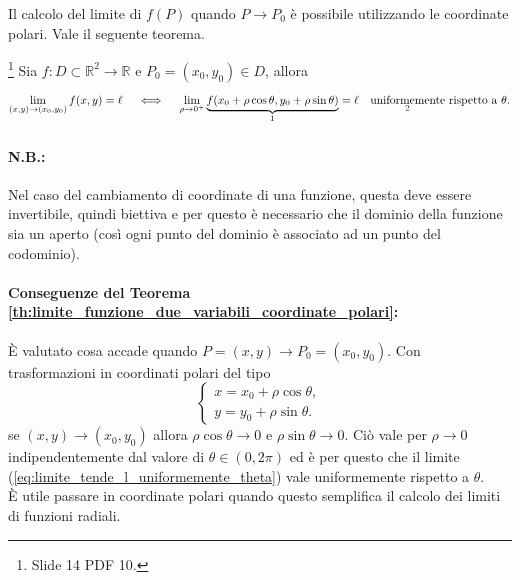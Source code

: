Il calcolo del limite di $f(P)$ quando $P\rightarrow P_0$ è possibile utilizzando le coordinate polari. Vale il seguente teorema.
\begin{theorem}\label{th:limite_funzione_due_variabili_coordinate_polari}\footnote{Slide 14 PDF 10.}
    Sia $f\colon D\subset\mathbb R^2\rightarrow\mathbb R$ e $P_0=(x_0,y_0)\in D$, allora
    \begin{equation}\label{eq:limite_tende_l_uniformemente_theta}
        \lim_{(x,y)\rightarrow(x_0,y_0)}f(x,y)=\ell\quad\iff\quad\lim_{\rho\rightarrow 0^+}\underbrace{f(x_0+\rho\cos\theta,y_0+\rho\sin\theta)}_{\footnotemark}=\ell\quad\text{$\underset{\footnotemark}{\text{uniformemente}}$ rispetto a $\theta$}.
    \end{equation}
\end{theorem}
\addtocounter{footnote}{-1}


\paragraph{N.B.:} Nel caso del cambiamento di coordinate di una funzione, questa deve essere invertibile, quindi biettiva e per questo è necessario che il dominio della funzione sia un aperto (così ogni punto del dominio è associato ad un punto del codominio).

\paragraph{Conseguenze del Teorema \ref{th:limite_funzione_due_variabili_coordinate_polari}:} È valutato cosa accade quando $P=(x,y)\rightarrow P_0=(x_0,y_0)$. Con trasformazioni in coordinati polari del tipo
\begin{equation*}
    \begin{cases}
        x=x_0+\rho\cos\theta,\\
        y=y_0+\rho\sin\theta.
    \end{cases}
\end{equation*}
se $(x,y)\rightarrow(x_0,y_0)$ allora $\rho\cos\theta\rightarrow 0$ e $\rho\sin\theta\rightarrow 0$. Ciò vale per $\rho\rightarrow 0$ indipendentemente dal valore di $\theta\in(0,2\pi)$ ed è per questo che il limite (\ref{eq:limite_tende_l_uniformemente_theta}) vale uniformemente rispetto a $\theta$.\\
È utile passare in coordinate polari quando questo semplifica il calcolo dei limiti di funzioni radiali.

